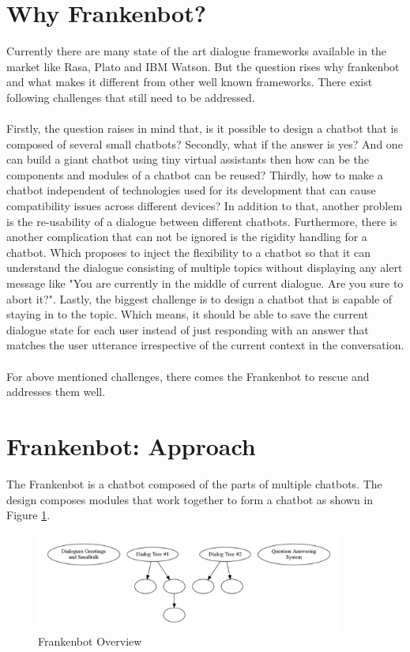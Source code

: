 \section{Why Frankenbot?}
Currently there are many state of the art dialogue frameworks available in the market like Rasa, Plato and IBM Watson. But the question rises why frankenbot and what makes it different from other well known frameworks. There exist following challenges that still need to be addressed.
\\~\\
Firstly, the question raises in mind that, is it possible to design a chatbot that is composed of several small chatbots? Secondly, what if the answer is yes? And one can build a giant chatbot using tiny virtual assistants then how can be the components and modules of a chatbot can be reused? Thirdly, how to make a chatbot independent of technologies used for its development that can cause compatibility issues across different devices? In addition to that, another problem is the re-usability of a dialogue between different chatbots. Furthermore, there is another complication that can not be ignored is the rigidity handling for a chatbot. Which proposes to inject the flexibility to a chatbot so that it can understand the dialogue consisting of multiple topics without displaying any alert message like "You are currently in the middle of current dialogue. Are you sure to abort it?". Lastly, the biggest challenge is to design a chatbot that is capable of staying in to the topic. Which means, it should be able to save the current dialogue state for each user instead of just responding with an answer that matches the user utterance irrespective of the current context in the conversation. 
\\~\\
For above mentioned challenges, there comes the Frankenbot to rescue and addresses them well.

\section{Frankenbot: Approach}
The Frankenbot is a chatbot composed of the parts of multiple chatbots. The design composes modules that work together to form a chatbot as shown in Figure \ref{fig:frankOver}.
\begin{figure}[h]
    \centering
    \includegraphics[width=0.9\textwidth]{img/Frankenbot_Overview.PNG}
    \caption{Frankenbot Overview}
    \label{fig:frankOver}
\end{figure}

